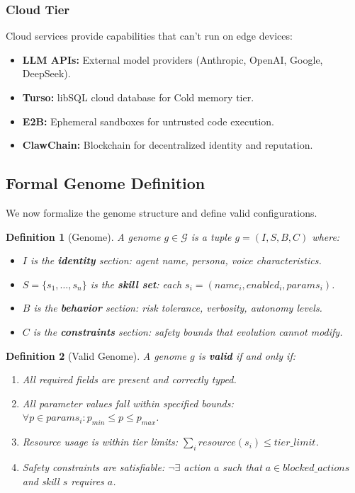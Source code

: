 \documentclass{article}
\newtheorem{definition}{Definition}
\newcommand{\genomespace}{\mathcal{G}}
\begin{document}
\subsubsection{Cloud Tier}

Cloud services provide capabilities that can't run on edge devices:

\begin{itemize}[leftmargin=*]
    \item \textbf{LLM APIs:} External model providers (Anthropic, OpenAI, Google, DeepSeek).
    \item \textbf{Turso:} libSQL cloud database for Cold memory tier.
    \item \textbf{E2B:} Ephemeral sandboxes for untrusted code execution.
    \item \textbf{ClawChain:} Blockchain for decentralized identity and reputation.
\end{itemize}

\subsection{Formal Genome Definition}

We now formalize the genome structure and define valid configurations.

\begin{definition}[Genome]
A genome $g \in \genomespace$ is a tuple $g = (I, S, B, C)$ where:
\begin{itemize}
    \item $I$ is the \textbf{identity} section: agent name, persona, voice characteristics.
    \item $S = \{s_1, \ldots, s_n\}$ is the \textbf{skill set}: each $s_i = (name_i, enabled_i, params_i)$.
    \item $B$ is the \textbf{behavior} section: risk tolerance, verbosity, autonomy levels.
    \item $C$ is the \textbf{constraints} section: safety bounds that evolution cannot modify.
\end{itemize}
\end{definition}

\begin{definition}[Valid Genome]
A genome $g$ is \textbf{valid} if and only if:
\begin{enumerate}
    \item All required fields are present and correctly typed.
    \item All parameter values fall within specified bounds: $\forall p \in params_i: p_{min} \leq p \leq p_{max}$.
    \item Resource usage is within tier limits: $\sum_i resource(s_i) \leq tier\_limit$.
    \item Safety constraints are satisfiable: $\neg \exists$ action $a$ such that $a \in blocked\_actions$ and skill $s$ requires $a$.
\end{enumerate}
\end{definition}
\end{document}
